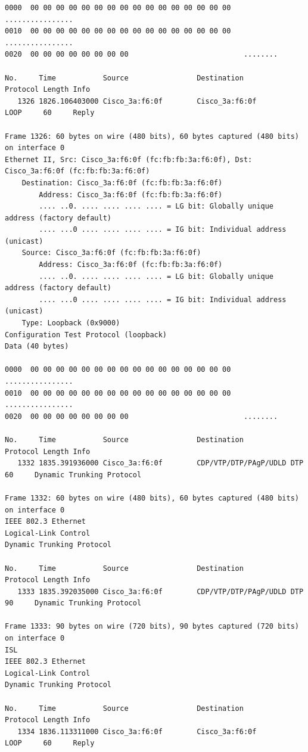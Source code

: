 \documentclass[a4paper,11pt]{article}
\begin{document}
\begin{lstlisting}
0000  00 00 00 00 00 00 00 00 00 00 00 00 00 00 00 00   ................
0010  00 00 00 00 00 00 00 00 00 00 00 00 00 00 00 00   ................
0020  00 00 00 00 00 00 00 00                           ........

No.     Time           Source                Destination           Protocol Length Info
   1326 1826.106403000 Cisco_3a:f6:0f        Cisco_3a:f6:0f        LOOP     60     Reply

Frame 1326: 60 bytes on wire (480 bits), 60 bytes captured (480 bits) on interface 0
Ethernet II, Src: Cisco_3a:f6:0f (fc:fb:fb:3a:f6:0f), Dst: Cisco_3a:f6:0f (fc:fb:fb:3a:f6:0f)
    Destination: Cisco_3a:f6:0f (fc:fb:fb:3a:f6:0f)
        Address: Cisco_3a:f6:0f (fc:fb:fb:3a:f6:0f)
        .... ..0. .... .... .... .... = LG bit: Globally unique address (factory default)
        .... ...0 .... .... .... .... = IG bit: Individual address (unicast)
    Source: Cisco_3a:f6:0f (fc:fb:fb:3a:f6:0f)
        Address: Cisco_3a:f6:0f (fc:fb:fb:3a:f6:0f)
        .... ..0. .... .... .... .... = LG bit: Globally unique address (factory default)
        .... ...0 .... .... .... .... = IG bit: Individual address (unicast)
    Type: Loopback (0x9000)
Configuration Test Protocol (loopback)
Data (40 bytes)

0000  00 00 00 00 00 00 00 00 00 00 00 00 00 00 00 00   ................
0010  00 00 00 00 00 00 00 00 00 00 00 00 00 00 00 00   ................
0020  00 00 00 00 00 00 00 00                           ........

No.     Time           Source                Destination           Protocol Length Info
   1332 1835.391936000 Cisco_3a:f6:0f        CDP/VTP/DTP/PAgP/UDLD DTP      60     Dynamic Trunking Protocol

Frame 1332: 60 bytes on wire (480 bits), 60 bytes captured (480 bits) on interface 0
IEEE 802.3 Ethernet 
Logical-Link Control
Dynamic Trunking Protocol

No.     Time           Source                Destination           Protocol Length Info
   1333 1835.392035000 Cisco_3a:f6:0f        CDP/VTP/DTP/PAgP/UDLD DTP      90     Dynamic Trunking Protocol

Frame 1333: 90 bytes on wire (720 bits), 90 bytes captured (720 bits) on interface 0
ISL
IEEE 802.3 Ethernet 
Logical-Link Control
Dynamic Trunking Protocol

No.     Time           Source                Destination           Protocol Length Info
   1334 1836.113311000 Cisco_3a:f6:0f        Cisco_3a:f6:0f        LOOP     60     Reply


\end{lstlisting}
\end{document}
